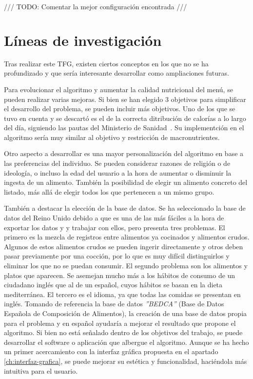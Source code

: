 \begin{center}
    {\color{red} \Large /// TODO: Comentar la mejor configuración encontrada ///}
\end{center}


\section{Líneas de investigación}
\label{ch:investigacion}

Tras realizar este TFG, existen ciertos conceptos en los que no se ha profundizado y que sería interesante desarrollar como ampliaciones futuras.

Para evolucionar el algoritmo y aumentar la calidad nutricional del menú, se pueden realizar varias mejoras. Si bien se han elegido 3 objetivos para simplificar el desarrollo del problema, se pueden incluir más objetivos. Uno de los que se tuvo en cuenta y se descartó es el de la correcta ditribución de calorías a lo largo del día, siguiendo las pautas del Ministerio de Sanidad~\cite{alimentacion_saludable}. Su implementción en el algoritmo sería muy similar al objetivo y restricción de macronutrientes.

Otro aspecto a desarrollar es una mayor personalización del algoritmo en base a las preferencias del individuo. Se pueden considerar razones de religión o de ideología, o incluso la edad del usuario a la hora de aumentar o disminuir la ingesta de un alimento. También la posibilidad de elegir un alimento concreto del listado, más allá de elegir todos los que pertenecen a un mismo grupo.

También a destacar la elección de la base de datos. Se ha seleccionado la base de datos del Reino Unido debido a que es una de las más fáciles a la hora de exportar los datos y y trabajar con ellos, pero presenta tres problemas. El primero es la mezcla de registros entre alimentos ya cocinados y alimentos crudos. Algunos de estos alimentos crudos se pueden ingerir directamente y otros deben pasar previamente por una cocción, por lo que es muy difícil distinguirlos y eliminar los que no se puedan consumir. El segundo problema son los alimentos y platos que aparecen. Se asemejan mucho más a los hábitos de consumo de un ciudadano inglés que al de un español, cuyos hábitos se basan en la dieta mediterránea. El tercero es el idioma, ya que todas las comidas se presentan en inglés. Tomando de referencia la base de datos \textit{''BEDCA''} (Base de Datos Española de Composición de Alimentos), la creación de una base de datos propia para el problema y en español ayudaría a mejorar el resultado que propone el algoritmo.
\newpage
Si bien no está señalado dentro de los objetivos del trabajo, se puede desarrollar el software o aplicación que albergue el algoritmo. Aunque se ha hecho un primer acercamiento con la interfaz gráfica propuesta en el apartado \ref{ch:interfaz-grafica}, se puede mejorar su estética y funcionalidad, haciéndola más intuitiva para el usuario.

